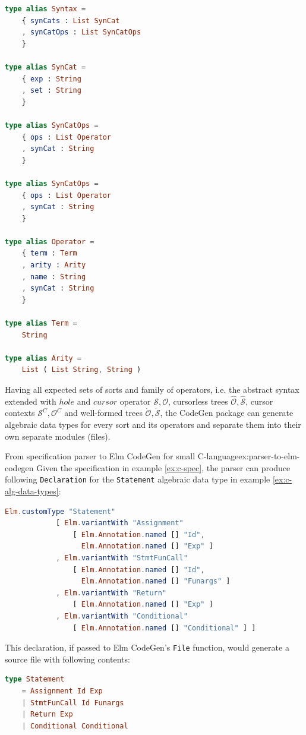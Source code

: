 \begin{lstlisting}[language=elm,style=inline,caption={Syntax model},label={lst:syntax-model}]
type alias Syntax =
    { synCats : List SynCat
    , synCatOps : List SynCatOps
    }

type alias SynCat =
    { exp : String
    , set : String
    }

type alias SynCatOps =
    { ops : List Operator
    , synCat : String
    }

type alias SynCatOps =
    { ops : List Operator
    , synCat : String
    }

type alias Operator =
    { term : Term
    , arity : Arity
    , name : String
    , synCat : String
    }

type alias Term =
    String

type alias Arity =
    List ( List String, String )
\end{lstlisting}

Having all expected sets of sorts and family of operators,
i.e. the abstract syntax extended with $hole$ and $cursor$ operator $\mathcal{S},
  \mathcal{O}$, cursorless trees $\hat{\mathcal{O}},\hat{\mathcal{S}}$,
cursor contexts $\mathcal{S}^C,\mathcal{O}^C$ and
well-formed trees $\dot{\mathcal{O}},\dot{\mathcal{S}}$,
the CodeGen package can generate algebraic data types for every sort and its operators
and separate them into their own separate modules (files).

\begin{example}{From specification parser to Elm CodeGen for small C-language}{ex:parser-to-elm-codegen}
  Given the specification in example \cref{ex:c-spec}, the parser can produce following \texttt{Declaration} for the \texttt{Statement} algebraic data type in example \cref{ex:c-alg-data-types}:
  \begin{lstlisting}[backgroundcolor=\color{myexamplecolorback},language=elm]
Elm.customType "Statement"
            [ Elm.variantWith "Assignment" 
                [ Elm.Annotation.named [] "Id", 
                  Elm.Annotation.named [] "Exp" ]
            , Elm.variantWith "StmtFunCall" 
                [ Elm.Annotation.named [] "Id", 
                  Elm.Annotation.named [] "Funargs" ]
            , Elm.variantWith "Return" 
                [ Elm.Annotation.named [] "Exp" ]
            , Elm.variantWith "Conditional" 
                [ Elm.Annotation.named [] "Conditional" ] ]
\end{lstlisting}

  This declaration, if passed to Elm CodeGen's \texttt{File} function, would generate a source file with following contents:
  \begin{lstlisting}[backgroundcolor=\color{myexamplecolorback},language=elm]
type Statement
    = Assignment Id Exp
    | StmtFunCall Id Funargs
    | Return Exp
    | Conditional Conditional
\end{lstlisting}
\end{example}

